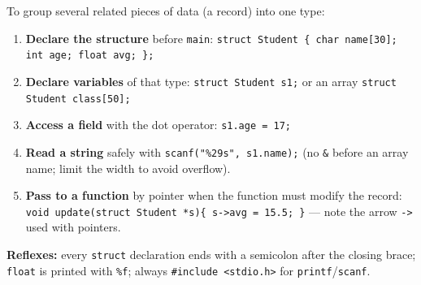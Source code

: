 \documentclass[11pt]{article}
\begin{document}
\begin{methode}
To group several related pieces of data (a record) into one type:
\begin{enumerate}
\item \textbf{Declare the structure} before \texttt{main}: \texttt{struct Student \{ char name[30]; int age; float avg; \};}
\item \textbf{Declare variables} of that type: \texttt{struct Student s1;} or an array \texttt{struct Student class[50];}
\item \textbf{Access a field} with the dot operator: \texttt{s1.age = 17;}
\item \textbf{Read a string} safely with \texttt{scanf("\%29s", s1.name);} (no \texttt{\&} before an array name; limit the width to avoid overflow).
\item \textbf{Pass to a function} by pointer when the function must modify the record: \texttt{void update(struct Student *s)\{ s->avg = 15.5; \}} — note the arrow \texttt{->} used with pointers.
\end{enumerate}
\textbf{Reflexes:} every \texttt{struct} declaration ends with a semicolon after the closing brace; \texttt{float} is printed with \texttt{\%f}; always \texttt{\#include <stdio.h>} for \texttt{printf}/\texttt{scanf}.
\end{methode}
\end{document}
